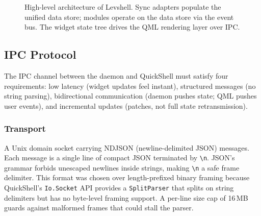 \documentclass[11pt,a4paper]{article}
\begin{document}
\begin{figure}[h]
\caption{High-level architecture of Levshell. Sync adapters populate the unified data store; modules operate on the data store via the event bus. The widget state tree drives the QML rendering layer over IPC.}
\label{fig:architecture}
\end{figure}


\subsection{IPC Protocol}
\label{sec:ipc}

The IPC channel between the daemon and QuickShell must satisfy four requirements: low latency (widget updates feel instant), structured messages (no string parsing), bidirectional communication (daemon pushes state; QML pushes user events), and incremental updates (patches, not full state retransmission).

\subsubsection{Transport}
A Unix domain socket carrying NDJSON (newline-delimited JSON) messages. Each message is a single line of compact JSON terminated by \texttt{\textbackslash n}. JSON's grammar forbids unescaped newlines inside strings, making \texttt{\textbackslash n} a safe frame delimiter. This format was chosen over length-prefixed binary framing because QuickShell's \texttt{Io.Socket} API provides a \texttt{SplitParser} that splits on string delimiters but has no byte-level framing support. A per-line size cap of 16\,MB guards against malformed frames that could stall the parser.
\end{document}
